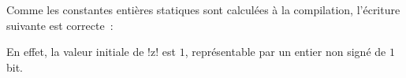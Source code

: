Comme les constantes entières statiques sont calculées à la compilation, l'écriture suivante est correcte~:

En effet, la valeur initiale de \plm!z! est $1$, représentable par un entier non signé de $1$ bit.


